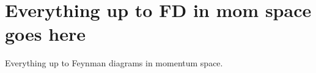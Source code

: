 
\section{Everything up to FD in mom space goes here}
\label{sec:everything-up-fd}

Everything up to Feynman diagrams in momentum space. 

